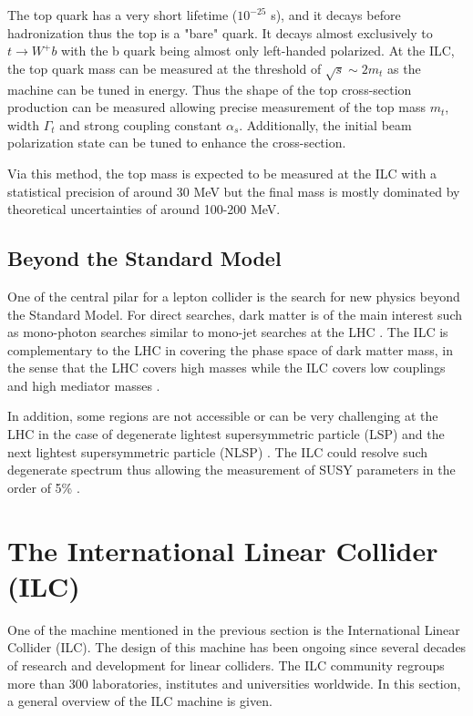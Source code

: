 The top quark has a very short lifetime ($10^{-25}$ s), and it decays before hadronization thus the top is a "bare" quark. It decays almost exclusively to $t \rightarrow W^+b$ with the b quark being almost only left-handed polarized. At the ILC, the top quark mass can be measured at the threshold of $\sqrt{s} \sim 2 m_t$ as the machine can be tuned in energy. Thus the shape of the top cross-section production can be measured allowing precise measurement of the top mass $m_t$, width $\Gamma_t$ and strong coupling constant $\alpha_s$. Additionally, the initial beam polarization state can be tuned to enhance the cross-section.

Via this method, the top mass is expected to be measured at the ILC with a statistical precision of around 30 MeV but the final mass is mostly dominated by theoretical uncertainties of around 100-200 MeV.

\subsection{Beyond the Standard Model}

One of the central pilar for a lepton collider is the search for new physics beyond the Standard Model. For direct searches, dark matter is of the main interest such as mono-photon searches similar to mono-jet searches at the LHC \cite{Gustavino:2017dub}. The ILC is complementary to the LHC in covering the phase space of dark matter mass, in the sense that the LHC covers high masses while the ILC covers low couplings and high mediator masses \cite{Habermehl:2017dxh}.

In addition, some regions are not accessible or can be very challenging at the LHC in the case of degenerate lightest supersymmetric particle (LSP) and the next lightest supersymmetric particle (NLSP) \cite{Baer:2011ec}. The ILC could resolve such degenerate spectrum thus allowing the measurement of SUSY parameters in the order of 5\% \cite{Reuter:2016olv}.

\section{The International Linear Collider (ILC)}
\label{sec:ILC}

One of the machine mentioned in the previous section is the International Linear Collider (ILC). The design of this machine has been ongoing since several decades of research and development for linear colliders. The ILC community regroups more than 300 laboratories, institutes and universities worldwide. In this section, a general overview of the ILC machine is given.

